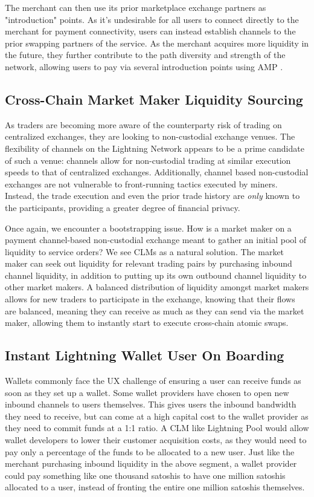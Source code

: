 \documentclass[10pt,a4paper]{article}
\theoremstyle{definition}
\begin{document}
The merchant can then use its prior marketplace exchange partners as
"introduction" points. As it's undesirable for all users to connect directly to
the merchant for payment connectivity, users can instead establish channels to
the prior swapping partners of the service. As the merchant acquires more
liquidity in the future, they further contribute to the path diversity and
strength of the network, allowing users to pay via several introduction points
using AMP \cite{amp}.

\subsection{Cross-Chain Market Maker Liquidity Sourcing}

As traders are becoming more aware of the counterparty risk of trading on
centralized exchanges, they are looking to non-custodial exchange venues. The
flexibility of channels on the Lightning Network appears to be a prime
candidate of such a venue: channels allow for non-custodial trading at similar
execution speeds to that of centralized exchanges. Additionally, channel based
non-custodial exchanges are not vulnerable to front-running tactics executed by
miners. Instead, the trade execution and even the prior trade history are
\emph{only} known to the participants, providing a greater degree of
financial privacy.

Once again, we encounter a bootstrapping issue. How is a market maker on a
payment channel-based non-custodial exchange meant to gather an initial pool of
liquidity to service orders? We see CLMs as a natural solution. The market
maker can seek out liquidity for relevant trading pairs by purchasing inbound
channel liquidity, in addition to putting up its own outbound channel liquidity
to other market makers. A balanced distribution of liquidity amongst market
makers allows for new traders to participate in the exchange, knowing that
their flows are balanced, meaning they can receive as much as they can send via
the market maker, allowing them to instantly start to execute cross-chain
atomic swaps.

\subsection{Instant Lightning Wallet User On Boarding}

Wallets commonly face the UX challenge of ensuring a user can receive funds as
soon as they set up a wallet. Some wallet providers have chosen to open new
inbound channels to users themselves. This gives users the inbound bandwidth
they need to receive, but can come at a high capital cost to the wallet
provider as they need to commit funds at a 1:1 ratio. A CLM like Lightning Pool would
allow wallet developers to
lower their customer acquisition costs, as they would need to pay only a percentage of
the funds to be allocated to a new user. Just like the merchant purchasing
inbound liquidity in the above segment, a wallet provider could pay something like
one thousand satoshis to have one million
satoshis allocated to a user, instead of fronting the entire one million satoshis
themselves.
\end{document}
